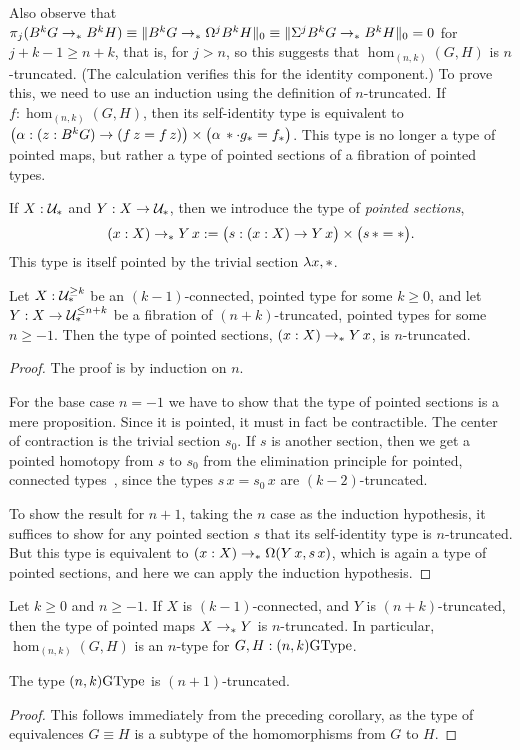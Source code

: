 Also observe that $\pi_j(B^kG \to_\pt B^kH) \equiv
\trunc{0}{B^kG \to_\pt \Omega^jB^kH} \equiv
\trunc{0}{\Sigma^jB^kG \to_\pt B^kH} = 0$ for $j+k-1 \ge n+k$,
that is, for $j>n$, so
this suggests that $\hom_{(n,k)}(G,H)$ is $n$-truncated.
(The calculation verifies this for the identity component.)
To prove
this, we need to use an induction using the definition of
$n$-truncated. If $f:\hom_{(n,k)}(G,H)$, then its self-identity type is
equivalent to $\bigl(\alpha : (z : B^kG) \to (f\,z = f\,z)\bigr) \times
\bigl(\alpha\,\pt \cdot g_\pt = f_\pt\bigr)$. This type is no longer a
type of pointed maps, but rather a type of pointed sections of a
fibration of pointed types.
\begin{defn}
  If $X : \UU_\pt$ and $Y : X \to \UU_\pt$, then we introduce the
  type of \emph{pointed sections},
  \[
    (x : X) \to_\pt Y\,x
    := \bigl(s : (x : X) \to Y\,x\bigr)
    \times \bigl(s\,\pt = \pt\bigr).
  \]
  This type is itself pointed by the trivial section $\lambda x, \pt$.
\end{defn}
\begin{thm}
  Let $X : \UU_\pt^{\ge k}$ be an $(k-1)$-connected, pointed type for
  some $k\ge0$, and
  let $Y : X \to \UU_\pt^{\le n+k}$ be a fibration of
  $(n+k)$-truncated, pointed types for some $n\ge -1$. Then the type
  of pointed sections, $(x : X) \to_\pt Y\,x$, is $n$-truncated.
\end{thm}
\begin{proof}
  The proof is by induction on $n$.

  For the base case $n=-1$ we have to show that the type of pointed
  sections is a mere proposition. Since it is pointed, it must in fact
  be contractible. The center of contraction is the trivial section $s_0$.
  If $s$ is another section, then we get a pointed homotopy from $s$
  to $s_0$ from the elimination principle for pointed, connected
  types~\cite[Lemma~7.5.7]{hottbook}, since the types $s\,x=s_0\,x$ are
  $(k-2)$-truncated.

  To show the result for $n+1$, taking the $n$ case as the induction
  hypothesis, it suffices to show for any pointed section $s$ that its
  self-identity type is $n$-truncated. But this type is equivalent to
  $(x : X) \to_\pt \Omega(Y\,x, s\,x)$, which is again a type of
  pointed sections, and here we can apply the induction hypothesis.
\end{proof}
\begin{cor}
  Let $k\ge0$ and $n\ge-1$. If $X$ is $(k-1)$-connected, and $Y$ is
  $(n+k)$-truncated, then the type of pointed maps $X \to_\pt Y$ is
  $n$-truncated. In particular, $\hom_{(n,k)}(G,H)$ is an $n$-type for
  $G,H:(n,k)\GType$.
\end{cor}
\begin{cor}
  The type $(n,k)\GType$ is $(n+1)$-truncated.
\end{cor}
\begin{proof}
  This follows immediately from the preceding corollary, as the type
  of equivalences $G \equiv H$ is a subtype of the homomorphisms from
  $G$ to $H$.
\end{proof}

